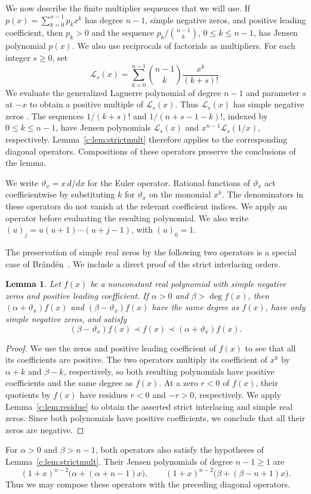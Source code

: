\documentclass[11pt]{article}
\numberwithin{equation}{section}
\newtheorem{lemma}[theorem]{Lemma}
\theoremstyle{remark}\newtheorem{remark}[theorem]{Remark}
\newcommand{\varthetax}{\vartheta_x}
\begin{document}
We now describe the finite multiplier sequences that we will use.
If $p(x)=\sum_{k=0}^{n-1}p_kx^k$
has degree $n-1$, simple negative zeros, and positive leading coefficient,
then $p_k>0$ and the sequence $p_k/\binom{n-1}{k}$, $0\le k\le n-1$,
has Jensen polynomial $p(x)$.
We also use reciprocals of factorials as multipliers. For each integer
$s\ge0$, set
\[
 \mathscr L_s(x)=\sum_{k=0}^{n-1}\binom{n-1}{k}\frac{x^k}{(k+s)!}.
\]
We evaluate the generalized Laguerre polynomial of degree $n-1$ and
parameter $s$ at $-x$ to obtain a positive multiple of $\mathscr L_s(x)$.
Thus $\mathscr L_s(x)$ has simple negative zeros
\cite[Sections 18.2(vi) and 18.5(iii)]{DLMF}.
The sequences $1/(k+s)!$ and $1/(n+s-1-k)!$, indexed by $0\le k\le n-1$,
have Jensen polynomials $\mathscr L_s(x)$ and $x^{n-1}\mathscr L_s(1/x)$,
respectively. Lemma~\ref{c:lem:strictmult} therefore applies to the
corresponding diagonal operators. Compositions of these operators preserve
the conclusions of the lemma.

We write $\varthetax=x\,d/dx$ for the Euler operator. Rational functions
of $\varthetax$ act coefficientwise by substituting $k$ for $\varthetax$
on the monomial $x^k$. The denominators in these operators do not vanish
at the relevant coefficient indices. We apply an operator before evaluating
the resulting polynomial. We also write $(u)_j=u(u+1)\cdots(u+j-1)$, with $(u)_0=1$.

The preservation of simple real zeros by the following two operators is
a special case of Br\"and\'en~\cite[Corollary~3.5]{BrandenPF}.
We include a direct proof of the strict interlacing orders.

\begin{lemma}\label{c:lem:euler}
Let $f(x)$ be a nonconstant real polynomial with simple negative zeros
and positive leading coefficient. If $\alpha>0$ and $\beta>\deg f(x)$, then
$(\alpha+\varthetax)f(x)$ and $(\beta-\varthetax)f(x)$ have the same degree
as $f(x)$, have only simple negative zeros, and satisfy
\[
 (\beta-\varthetax)f(x)\prec f(x)\prec(\alpha+\varthetax)f(x).
\]
\end{lemma}
\begin{proof}
We use the zeros and positive leading coefficient of $f(x)$ to see that
all its coefficients are positive. The two operators multiply its coefficient of $x^k$ by
$\alpha+k$ and $\beta-k$, respectively, so both resulting polynomials have positive
coefficients and the same degree as $f(x)$. At a zero $r<0$ of $f(x)$,
their quotients by $f(x)$ have residues $r<0$ and $-r>0$, respectively.
We apply Lemma~\ref{c:lem:residue} to obtain the asserted strict interlacing and simple
real zeros. Since both polynomials have positive coefficients, we conclude that all their zeros are negative.
\end{proof}
For $\alpha>0$ and $\beta>n-1$, both operators
also satisfy the hypotheses of Lemma~\ref{c:lem:strictmult}.
Their Jensen polynomials of degree $n-1\ge1$ are
\[
 (1+x)^{n-2}\bigl(\alpha+(\alpha+n-1)x\bigr),\qquad
 (1+x)^{n-2}\bigl(\beta+(\beta-n+1)x\bigr).
\]
Thus we may compose these operators with the preceding diagonal operators.
\end{document}
